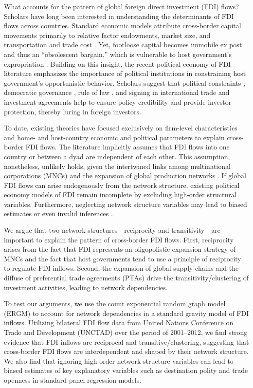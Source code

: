 \documentclass[12pt]{article}
\begin{document}
What accounts for the pattern of global foreign direct investment (FDI) flows? Scholars have long been interested in understanding the determinants of FDI flows across countries. Standard economic models attribute cross-border capital movements primarily to relative factor endowments, market size, and transportation and trade cost \citep[see,~e.g.,][]{Helpman:1984,Carr_et_al:2001}. Yet, footloose capital becomes immobile ex post and thus an ``obsolescent bargain,'' which is vulnerable to host government's expropriation \citep{Vernon:1971,Vernon:1980}. Building on this insight, the recent political economy of FDI literature emphasizes the importance of political institutions in constraining host government's opportunistic behavior. Scholars suggest that political constraints \citep{Henisz:2000}, democratic governance \citep{Jensen:2003,Jensen:2006}, rule of law \citep{Li_Resnick:2003,Staats_Biglaiser:2012}, and signing in international trade and investment agreements \citep{Buthe_Milner:2008,Allee_Peinhardt:2011} help to ensure policy credibility and provide investor protection, thereby luring in foreign investors.

To date, existing theories have focused exclusively on firm-level characteristics and home- and host-country economic and political parameters to explain cross-border FDI flows. The literature implicitly assumes that FDI flows into one country or between a dyad are independent of each other. This assumption, nonetheless, unlikely holds, given the intertwined links among multinational corporations (MNCs) and the expansion of global production networks \citep{UNCTAD:2013}. If global FDI flows can arise endogenously from the network structure, existing political economy models of FDI remain incomplete by excluding high-order structural variables. Furthermore, neglecting network structure variables may lead to biased estimates or even invalid inferences \citep{cranmer2011inferential}.

We argue that two network structures---reciprocity and transitivity---are important to explain the pattern of cross-border FDI flows. First, reciprocity arises from the fact that FDI represents an oligopolistic expansion strategy of MNCs and the fact that host governments tend to use a principle of reciprocity to regulate FDI inflows. Second, the expansion of global supply chains and the diffuse of preferential trade agreements (PTAs) drive the transitivity/clustering of investment activities, leading to network dependencies.

To test our arguments, we use the count exponential random graph model (ERGM) to account for network dependencies in a standard gravity model of FDI inflows. Utilizing bilateral FDI flow data from United Nations Conference on Trade and Development (UNCTAD) over the period of 2001--2012, we find strong evidence that FDI inflows are reciprocal and transitive/clustering, suggesting that cross-border FDI flows are interdependent and shaped by their network structure. We also find that ignoring high-order network structure variables can lead to biased estimates of key explanatory variables such as destination polity and trade openness in standard panel regression models.
\end{document}
